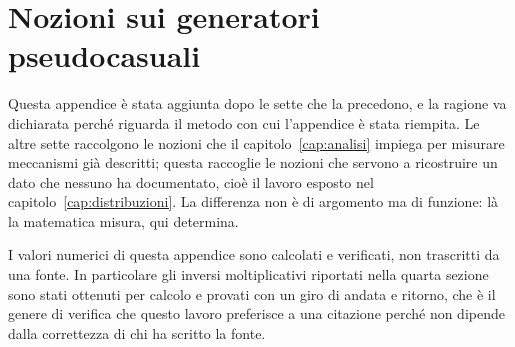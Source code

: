 
\chapter{Nozioni sui generatori pseudocasuali}
\label{app:generatori}

Questa appendice è stata aggiunta dopo le sette che la precedono, e la ragione va dichiarata perché riguarda il metodo con cui l'appendice è stata riempita. Le altre sette raccolgono le nozioni che il capitolo~\ref{cap:analisi} impiega per misurare meccanismi già descritti; questa raccoglie le nozioni che servono a ricostruire un dato che nessuno ha documentato, cioè il lavoro esposto nel capitolo~\ref{cap:distribuzioni}. La differenza non è di argomento ma di funzione: là la matematica misura, qui determina.

I valori numerici di questa appendice sono calcolati e verificati, non trascritti da una fonte. In particolare gli inversi moltiplicativi riportati nella quarta sezione sono stati ottenuti per calcolo e provati con un giro di andata e ritorno, che è il genere di verifica che questo lavoro preferisce a una citazione perché non dipende dalla correttezza di chi ha scritto la fonte.

